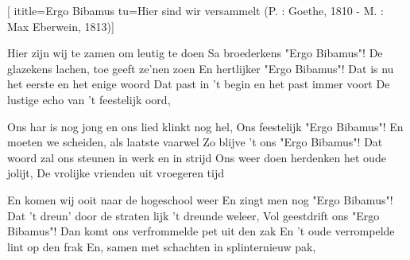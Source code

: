  [
ititle={Ergo Bibamus}
tu={Hier sind wir versammelt (P. : Goethe, 1810 - M. : Max Eberwein, 1813)}]

\beginverse
Hier zijn wij te zamen om leutig te doen
Sa broederkens "Ergo Bibamus"!
De glazekens lachen, toe geeft ze'nen zoen
En hertlijker "Ergo Bibamus"!
Dat is nu het eerste en het enige woord
Dat past in 't begin en het past immer voort
De lustige echo van 't feestelijk oord,
\endverse

\beginverse
Ons har is nog jong en ons lied klinkt nog hel,
Ons feestelijk "Ergo Bibamus"!
En moeten we scheiden, als laatste vaarwel
Zo blijve 't ons "Ergo Bibamus"!
Dat woord zal ons steunen in werk en in strijd
Ons weer doen herdenken het oude jolijt,
De vrolijke vrienden uit vroegeren tijd
\endverse

\beginverse
En komen wij ooit naar de hogeschool weer
En zingt men nog "Ergo Bibamus"!
Dat 't dreun' door de straten lijk 't dreunde weleer,
Vol geestdrift ons "Ergo Bibamus"!
Dan komt ons verfrommelde pet uit den zak
En 't oude verrompelde lint op den frak
En, samen met schachten in splinternieuw pak,
\endverse
\endsong